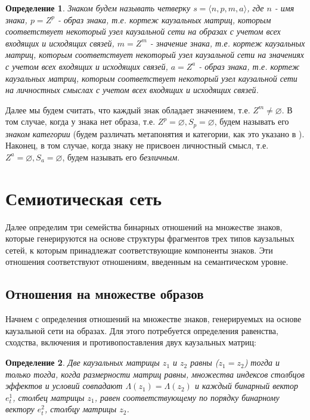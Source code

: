 \documentclass[12pt]{scrartcl}
\newtheorem{definition}{Определение}
\begin{document}
	\begin{definition}
		Знаком будем называть четверку $s=\langle n, p, m, a \rangle$, где $n$ - имя знака, $p=Z^p$ - образ знака, т.е. кортеж каузальных матриц, которым соответствует некоторый узел каузальной сети на образах с учетом всех входящих и исходящих связей, $m=Z^m$ - значение знака, т.е. кортеж каузальных матриц, которым соответствует некоторый узел каузальной сети на значениях  с учетом всех входящих и исходящих связей, $a=Z^a$ - образ знака, т.е. кортеж каузальных матриц, которым соответствует некоторый узел каузальной сети на личностных смыслах  с учетом всех входящих и исходящих связей.
	\end{definition}
	
	Далее мы будем считать, что каждый знак обладает значением, т.е. $Z^m\not = \varnothing$. В том случае, когда у знака нет образа, т.е. $Z^p=\varnothing,S_p=\varnothing$, будем называть его \textit{знаком категории} (будем различать метапонятия и категории, как это указано в \cite{Osipov1997}). Наконец, в том случае, когда знаку не присвоен личностный смысл, т.е. $Z^a=\varnothing, S_a=\varnothing$, будем называть его \textit{безличным}.
	
	\section{Семиотическая сеть}\label{sec:semnetwork}
	
	Далее определим три семейства бинарных отношений на множестве знаков, которые  генерируются на основе структуры фрагментов трех типов каузальных сетей, к которым принадлежат соответствующие компоненты знаков. Эти отношения соответствуют отношениям, введенным на семантическом уровне.
		
	\subsection{Отношения на множестве образов}	
	
	Начнем с определения отношений на множестве знаков, генерируемых на основе каузальной сети на образах. Для этого потребуется определения равенства, сходства, включения и противопоставления двух каузальных матриц:
	
	\begin{definition}
		Две каузальных матрицы $z_1$ и $z_2$ равны ($z_1=z_2$) тогда и только тогда, когда размерности матриц равны, множества индексов столбцов эффектов и условий совпадают $\Lambda({z_1})=\Lambda({z_2})$ и каждый бинарный вектор $e_t^1$, столбец матрицы $z_1$, равен соответствующему по порядку бинарному вектору $e_t^2$, столбцу матрицы $z_2$.
	\end{definition}
	
\end{document}
